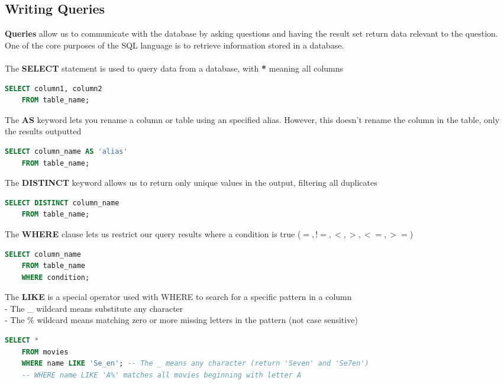 \documentclass[11pt, a4paper]{article}
\begin{document}
\begin{spacing}{1.1}
	\subsection{Writing Queries}
	\textbf{Queries} allow us to communicate with the database by asking questions and having the result set return data relevant to the question. One of the core purposes of the SQL language is to retrieve information stored in a database. \\~\\
	The \textbf{SELECT} statement is used to query data from a database, with \textbf{*} meaning all columns 
	\begin{lstlisting}[language=SQL]
	SELECT column1, column2 
	FROM table_name; \end{lstlisting} \vspace*{1mm}
	The \textbf{AS} keyword lets you rename a column or table using an specified alias. However, this doesn't rename the column in the table, only the results outputted
	\begin{lstlisting}[language=SQL]
	SELECT column_name AS 'alias'
	FROM table_name; \end{lstlisting} \vspace*{1mm}
	The \textbf{DISTINCT} keyword allows us to return only unique values in the output, filtering all duplicates
	\begin{lstlisting}[language=SQL]
	SELECT DISTINCT column_name 
	FROM table_name; \end{lstlisting} \vspace*{1mm}
	The \textbf{WHERE} clause lets us restrict our query results where a condition is true ($=,!=,<,>,<=,>=$)
	\begin{lstlisting}[language=SQL]
	SELECT column_name 
	FROM table_name 
	WHERE condition; \end{lstlisting} \vspace*{1mm}
	The \textbf{LIKE} is a special operator used with WHERE to search for a specific pattern in a column \\
	\hspace*{3mm} - The \_ wildcard means substitute any character\\
	\hspace*{3mm} - The \% wildcard means matching zero or more missing letters in the pattern (not case sensitive)
	\begin{lstlisting}[language=SQL]
	SELECT * 
	FROM movies
	WHERE name LIKE 'Se_en'; -- The _ means any character (return 'Seven' and 'Se7en')
	-- WHERE name LIKE 'A%' matches all movies beginning with letter A

\end{lstlisting}
\end{spacing}
\end{document}
